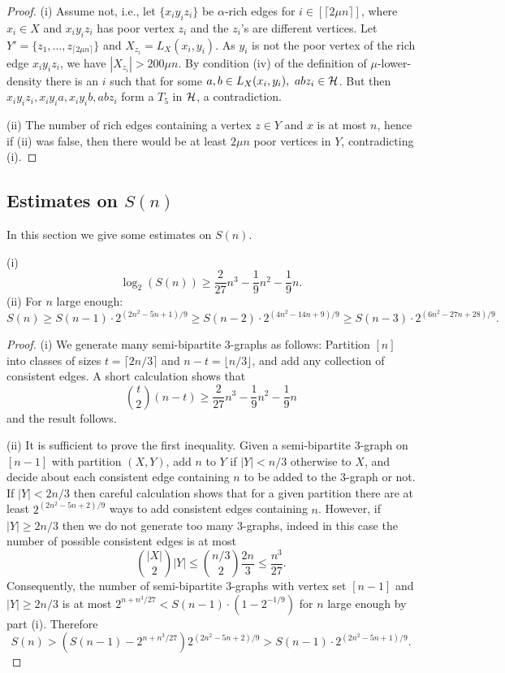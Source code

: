 \documentclass[11pt]{article}
\begin{document}
\begin{proof}
(i) Assume not, i.e., let $\{x_iy_iz_i\}$ be $\alpha$-rich
edges for $i\in [\lceil 2\mu n\rceil ]$, where $x_i\in X$ and
 $x_iy_iz_i$ has poor vertex $z_i$ and the $z_i$'s are
different vertices. Let $Y'=\{z_1,\ldots,z_{\lceil 2\mu
n\rceil}\}$ and $X_{z_i}=L_X(x_i,y_i)$. As $y_i$ is not the poor
vertex of the rich edge $x_iy_iz_i$, we have $|X_{z_i}|>200\mu n$.
By condition (iv) of the definition of $\mu$-lower-density  there is
an $i$ such that for some $a,b\in L_X(x_i,y_i), \ abz_i\in \HH$. But
then $x_iy_iz_i, x_iy_ia, x_iy_ib, abz_i$ form a $T_5$ in $\mathcal{H}$,  a
contradiction.

(ii) The number of rich edges containing a vertex $z\in Y$ and $x$ is at most $n$, hence if (ii) was false,
then there would be at least $2\mu n$ poor vertices in $Y$, contradicting (i).
\end{proof}



\subsection{Estimates on $S(n)$}\label{estsn}

In this section we give some estimates on $S(n)$.

\begin{lemma}\label{mon}
(i)
$$\log_2 (S(n))\ge \frac{2}{27} n^3-\frac{1}{9} n^2-\frac{1}{9} n.$$
(ii) For $n$ large enough:
 $$S(n)\ge  S(n-1)\cdot 2^{(2n^2-5n+1)/9}\ge  S(n-2)\cdot
2^{(4n^2-14n+9)/9} \ge  S(n-3)\cdot 2^{(6n^2-27n+28)/9}.$$
\end{lemma}

\begin{proof}
(i) We generate many semi-bipartite
3-graphs as follows: Partition $[n]$ into classes of sizes
$t=\lceil 2n/3\rceil$ and $n-t=\lfloor n/3\rfloor$, and add any
collection of consistent edges. A short calculation shows that
$${t \choose 2}(n-t)\ge \frac{2}{27} n^3-\frac{1}{9} n^2-\frac{1}{9} n$$
and the result follows.


(ii) It is sufficient to prove the first inequality. Given a
semi-bipartite 3-graph on $[n-1]$ with partition $(X,Y)$, add $n$
to $Y$ if $|Y|<n/3$ otherwise to $X$, and decide about each
consistent edge containing $n$ to be added to the 3-graph or not.
If $|Y|<2n/3$ then careful calculation shows that for a given
partition there are at least $2^{(2n^2-5n+2)/9}$ ways to add
consistent edges containing $n$. However, if $|Y|\ge 2n/3$ then
 we do not generate too many 3-graphs, indeed in this case the number of possible consistent edges is at most
 $${|X| \choose 2}|Y| \le {n/3 \choose 2}\frac{2n}{3}\le \frac{n^3}{27}.$$ Consequently, the number of semi-bipartite
  $3$-graphs with vertex set $[n-1]$ and $|Y| \ge 2n/3$ is at most $2^{n+n^3/27}<S(n-1)\cdot (1-2^{-1/9})$ for $n$ large enough
  by part (i).
 Therefore
$$S(n)>(S(n-1)-2^{n+n^3/27})2^{(2n^2-5n+2)/9}>S(n-1)\cdot
2^{(2n^2-5n+1)/9}.$$
\end{proof}
\end{document}
